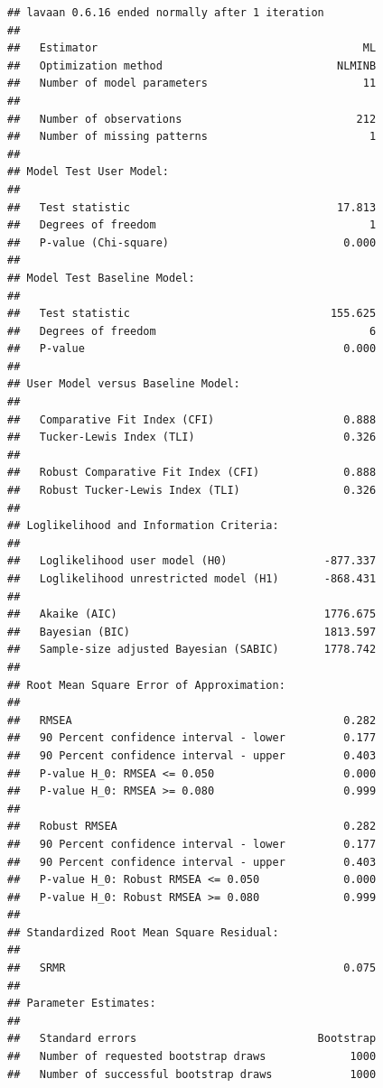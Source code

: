\documentclass[
  11pt,
]{book}
\begin{document}
\begin{verbatim}
## lavaan 0.6.16 ended normally after 1 iteration
## 
##   Estimator                                         ML
##   Optimization method                           NLMINB
##   Number of model parameters                        11
## 
##   Number of observations                           212
##   Number of missing patterns                         1
## 
## Model Test User Model:
##                                                       
##   Test statistic                                17.813
##   Degrees of freedom                                 1
##   P-value (Chi-square)                           0.000
## 
## Model Test Baseline Model:
## 
##   Test statistic                               155.625
##   Degrees of freedom                                 6
##   P-value                                        0.000
## 
## User Model versus Baseline Model:
## 
##   Comparative Fit Index (CFI)                    0.888
##   Tucker-Lewis Index (TLI)                       0.326
##                                                       
##   Robust Comparative Fit Index (CFI)             0.888
##   Robust Tucker-Lewis Index (TLI)                0.326
## 
## Loglikelihood and Information Criteria:
## 
##   Loglikelihood user model (H0)               -877.337
##   Loglikelihood unrestricted model (H1)       -868.431
##                                                       
##   Akaike (AIC)                                1776.675
##   Bayesian (BIC)                              1813.597
##   Sample-size adjusted Bayesian (SABIC)       1778.742
## 
## Root Mean Square Error of Approximation:
## 
##   RMSEA                                          0.282
##   90 Percent confidence interval - lower         0.177
##   90 Percent confidence interval - upper         0.403
##   P-value H_0: RMSEA <= 0.050                    0.000
##   P-value H_0: RMSEA >= 0.080                    0.999
##                                                       
##   Robust RMSEA                                   0.282
##   90 Percent confidence interval - lower         0.177
##   90 Percent confidence interval - upper         0.403
##   P-value H_0: Robust RMSEA <= 0.050             0.000
##   P-value H_0: Robust RMSEA >= 0.080             0.999
## 
## Standardized Root Mean Square Residual:
## 
##   SRMR                                           0.075
## 
## Parameter Estimates:
## 
##   Standard errors                            Bootstrap
##   Number of requested bootstrap draws             1000
##   Number of successful bootstrap draws            1000

\end{verbatim}
\end{document}
